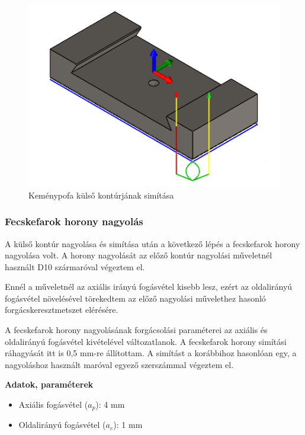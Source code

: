 \documentclass[12pt,a4paper,oneside]{report}
\begin{document}
\begin{figure}[H]
    \centering
    \includegraphics[width=12cm]{figures/kemenypofa_contour_1.png}
    \caption{Keménypofa külső kontúrjának simítása}
    \label{Fig:kemenypofa_contour_1}
\end{figure}

\subsubsection{Fecskefarok horony nagyolás}
A külső kontúr nagyolása és simítása után a következő lépés a fecskefarok horony nagyolása volt. A horony nagyolását az előző kontúr nagyolási műveletnél használt D10 szármaróval végeztem el.

Ennél a műveletnél az axiális irányú fogásvétel kisebb lesz, ezért az oldalirányú fogásvétel növelésével törekedtem az előző nagyolási művelethez hasonló forgácskeresztmetszet elérésére.

A fecskefarok horony nagyolásának forgácsolási paraméterei az axiális és oldalirányú fogásvétel kivételével változatlanok. A fecskefarok horony simítási ráhagyását itt is 0,5 mm-re állítottam. A simítást a korábbihoz hasonlóan egy, a nagyoláshoz használt maróval egyező szerszámmal végeztem el.

\textbf{Adatok, paraméterek}
\begin{itemize}
    \item Axiális fogásvétel ($a_p$): 4 mm
    \item Oldalirányú fogásvétel ($a_e$): 1 mm
\end{itemize}
\end{document}
